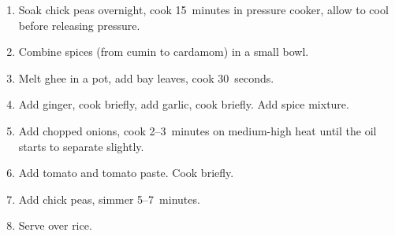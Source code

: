 
\begin{ingredients}
\end{ingredients}


\begin{recipe}
  \begin{enumerate}

  \item Soak chick peas overnight, cook 15~minutes in pressure cooker,
    allow to cool before releasing pressure.

  \item Combine spices (from cumin to cardamom) in a small bowl.

  \item Melt ghee in a pot, add bay leaves, cook 30~seconds.

  \item Add ginger, cook briefly, add garlic, cook briefly.  Add spice
    mixture.

  \item Add chopped onions, cook 2--3~minutes on medium-high heat
    until the oil starts to separate slightly.

  \item Add tomato and tomato paste.  Cook briefly.

  \item Add chick peas, simmer 5--7~minutes.

  \item Serve over rice.

  \end{enumerate}
\end{recipe}

